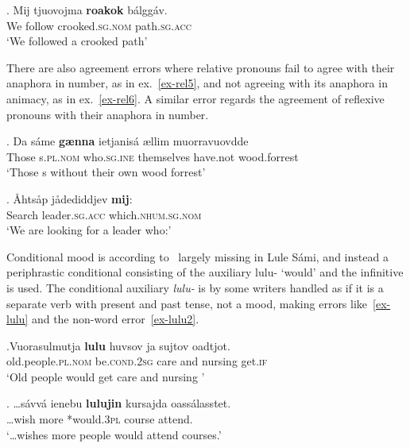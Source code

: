 \documentclass[free]{flammie}
\begin{document}
\exg. Mij tjuovojma \textbf{roa\textipa{\ng}kok} bálggáv.\label{ex-pred}\\
We follow crooked\textsc{.sg.nom} path\textsc{.sg.acc}\\
`We followed a crooked path'








There are also agreement errors where relative pronouns fail to agree with their
anaphora in number, as in ex.~\ref{ex-rel5}, and not agreeing with its anaphora
in animacy, as in ex.~\ref{ex-rel6}.  A similar error regards the agreement of
reflexive pronouns with their anaphora in number.

\exg. Da sáme \textbf{gænna} ietjanisá ællim muorravuovdde\label{ex-rel5}\\
Those s\textsc{.pl.nom} who\textsc{.sg.ine} themselves have.not wood.forrest\\
`Those s without their own wood forrest'

\exg. Åhtsåp jådediddjev \textbf{mij}:\label{ex-rel6}\\
Search leader\textsc{.sg.acc} which\textsc{.nhum.sg.nom}\\
`We are looking for a leader who:'







Conditional mood is according to~\cite{ylikoski2022lule} largely missing in Lule
Sámi, and instead a periphrastic conditional consisting of the auxiliary lulu-
‘would’ and the infinitive is used. The conditional auxiliary \textit{lulu-} is
by some writers handled as if it is a separate verb with present and past tense,
not a mood, making errors like~\ref{ex-lulu} and the non-word
error~\ref{ex-lulu2}.

\exg.Vuorasulmutja \textbf{lulu} huvsov ja sujtov oadtjot.\label{ex-lulu}\\
old.people\textsc{.pl.nom} be\textsc{.cond.2sg} care and nursing get\textsc{.if}
\\
`Old people would get care and nursing '

\exg. \ldots{}sávvá ienebu \textbf{lulujin} kursajda
oassálasstet.\label{ex-lulu2}\\
\ldots{}wish more *would\textsc{.3pl} course attend.\\
`\ldots wishes more people would attend courses.'
\end{document}
